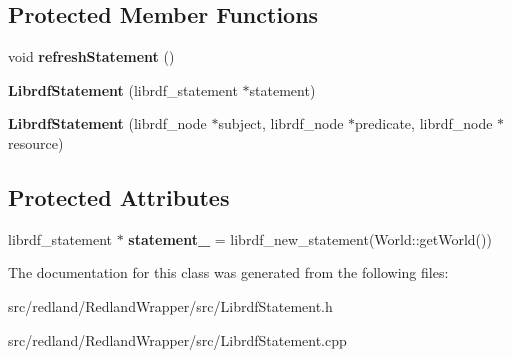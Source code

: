 \subsection*{Protected Member Functions}
\begin{DoxyCompactItemize}
\item 
\mbox{\label{classredland_1_1LibrdfStatement_afd63d6425b2130dbe4e76fdee4d7218b}} 
void {\bfseries refresh\+Statement} ()
\item 
\mbox{\label{classredland_1_1LibrdfStatement_a4cbbbf99d094cea4569324a8c67789fb}} 
{\bfseries Librdf\+Statement} (librdf\+\_\+statement $\ast$statement)
\item 
\mbox{\label{classredland_1_1LibrdfStatement_ac1b38e67ff0b90ac54b27c4f5f5d9e12}} 
{\bfseries Librdf\+Statement} (librdf\+\_\+node $\ast$subject, librdf\+\_\+node $\ast$predicate, librdf\+\_\+node $\ast$resource)
\end{DoxyCompactItemize}
\subsection*{Protected Attributes}
\begin{DoxyCompactItemize}
\item 
\mbox{\label{classredland_1_1LibrdfStatement_acd1e53cd114c6744cf808174a9333ce5}} 
librdf\+\_\+statement $\ast$ {\bfseries statement\+\_\+} = librdf\+\_\+new\+\_\+statement(World\+::get\+World())
\end{DoxyCompactItemize}


The documentation for this class was generated from the following files\+:\begin{DoxyCompactItemize}
\item 
src/redland/\+Redland\+Wrapper/src/Librdf\+Statement.\+h\item 
src/redland/\+Redland\+Wrapper/src/Librdf\+Statement.\+cpp\end{DoxyCompactItemize}
